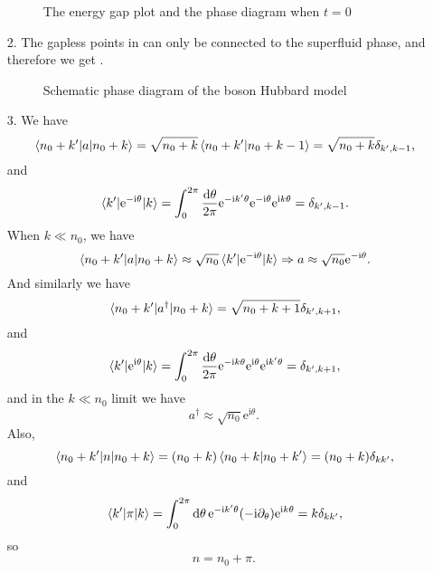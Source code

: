 \documentclass[hyperref, a4paper]{article}
\newcommand*{\ii}{\mathrm{i}}
\newcommand*{\ee}{\mathrm{e}}
\begin{document}
\begin{itemize}
\begin{figure}
    \centering
    
    \caption{The energy gap plot and the phase diagram when $t = 0$}
    \label{fig:mott-phase}
\end{figure}

\item[2.] The gapless points in  can only be connected to the superfluid phase,
and therefore we get .

\begin{figure}
    \centering
    
    \caption{Schematic phase diagram of the boson Hubbard model}
    \label{fig:boson-hubbard}
\end{figure}

\item[3.] We have 
\begin{equation}
    \mel{n_0 + k'}{a}{n_0 + k} = \sqrt{n_0 + k} \braket{n_0 + k'}{n_0 + k - 1} 
    = \sqrt{n_0 + k} \delta_{k', k-1},
\end{equation}
and 
\begin{equation}
    \mel{k'}{\ee^{- \ii \theta}}{k} 
    = \int_{0}^{2\pi} \frac{\dd{\theta}}{2\pi} \ee^{- \ii k' \theta} \ee^{- \ii \theta} \ee^{\ii k \theta}
    = \delta_{k', k - 1}.
\end{equation}
When $k \ll n_0$, we have 
\begin{equation}
    \mel{n_0 + k'}{a}{n_0 + k} \approx \sqrt{n_0} \mel{k'}{\ee^{- \ii \theta}}{k} \Rightarrow
    a \approx \sqrt{n_0} \ee^{- \ii \theta}.
\end{equation}
And similarly we have 
\begin{equation}
    \mel{n_0 + k'}{a^\dagger}{n_0 + k} = \sqrt{n_0 + k + 1} \delta_{k', k+1},
\end{equation}
and 
\begin{equation}
    \mel{k'}{\ee^{\ii \theta}}{k} 
    = \int_0^{2\pi} \frac{\dd{\theta}}{2\pi} \ee^{- \ii k \theta} \ee^{\ii \theta} \ee^{\ii k' \theta}
    = \delta_{k', k+1},
\end{equation}
and in the $k \ll n_0$ limit we have 
\begin{equation}
    a^{\dagger} \approx \sqrt{n_0} \ee^{\ii \theta}.
\end{equation}
Also, 
\begin{equation}
    \mel{n_0 + k'}{n}{n_0 + k} = (n_0 + k) \braket{n_0 + k}{n_0 + k'} = (n_0 + k) \delta_{k k'},
\end{equation}
and 
\begin{equation}
    \mel{k'}{\pi}{k} = \int_0^{2\pi} \dd{\theta} \ee^{- \ii k' \theta} (-\ii \partial_\theta) \ee^{\ii k \theta}
    = k \delta_{k k'},
\end{equation}
so 
\begin{equation}
    n = n_0 + \pi.
\end{equation}


\end{itemize}
\end{document}
